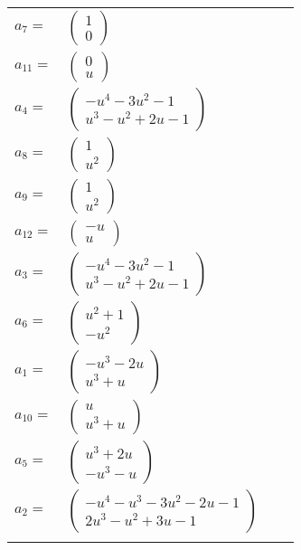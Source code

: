 \documentclass[1p]{elsarticle_modified}
\theoremstyle{definition}
\begin{document}
\begin{tabular}{m{7pt} m{180pt} m{7pt} m{180pt} }
\flushright $a_{7}=$&$\begin{pmatrix}1\\0\end{pmatrix}$ \\
\flushright $a_{11}=$&$\begin{pmatrix}0\\u\end{pmatrix}$ \\
\flushright $a_{4}=$&$\begin{pmatrix}- u^4-3 u^2-1\\u^3- u^2+2 u-1\end{pmatrix}$ \\
\flushright $a_{8}=$&$\begin{pmatrix}1\\u^2\end{pmatrix}$ \\
\flushright $a_{9}=$&$\begin{pmatrix}1\\u^2\end{pmatrix}$ \\
\flushright $a_{12}=$&$\begin{pmatrix}- u\\u\end{pmatrix}$ \\
\flushright $a_{3}=$&$\begin{pmatrix}- u^4-3 u^2-1\\u^3- u^2+2 u-1\end{pmatrix}$ \\
\flushright $a_{6}=$&$\begin{pmatrix}u^2+1\\- u^2\end{pmatrix}$ \\
\flushright $a_{1}=$&$\begin{pmatrix}- u^3-2 u\\u^3+u\end{pmatrix}$ \\
\flushright $a_{10}=$&$\begin{pmatrix}u\\u^3+u\end{pmatrix}$ \\
\flushright $a_{5}=$&$\begin{pmatrix}u^3+2 u\\- u^3- u\end{pmatrix}$ \\
\flushright $a_{2}=$&$\begin{pmatrix}- u^4- u^3-3 u^2-2 u-1\\2 u^3- u^2+3 u-1\end{pmatrix}$\\&\end{tabular}
\end{document}
